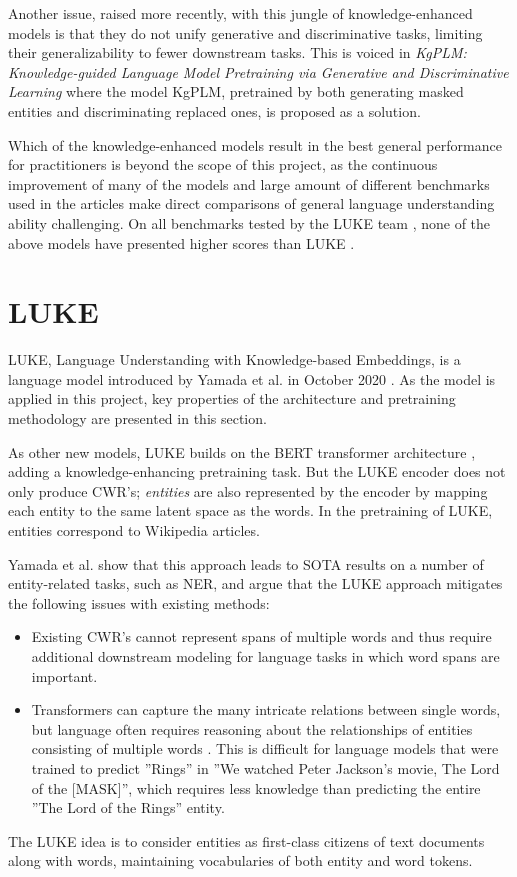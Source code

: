 \documentclass[main.tex]{subfiles}
\begin{document}
Another issue, raised more recently, with this jungle of knowledge-enhanced models is that they do not unify generative and discriminative tasks, limiting their generalizability to fewer downstream tasks.
This is voiced in \emph{KgPLM: Knowledge-guided Language Model Pretraining via Generative and Discriminative Learning} \cite{he2020kgplm} where the model KgPLM, pretrained by both generating masked entities and discriminating replaced ones, is proposed as a solution.

Which of the knowledge-enhanced models result in the best general performance for practitioners is beyond the scope of this project, as the continuous improvement of many of the models and large amount of different benchmarks used in the articles make direct comparisons of general language understanding ability challenging.
On all benchmarks tested by the LUKE team \cite{yamada2020luke}, none of the above models have presented higher scores than LUKE \cite[Sec. 4]{yamada2020luke}.


\section{LUKE}
\label{sec:LUKE}
LUKE, Language Understanding with Knowledge-based Embeddings, is a language model introduced by Yamada et al. in October 2020 \cite{yamada2020luke}.
As the model is applied in this project, key properties of the architecture and pretraining methodology are presented in this section.

As other new models, LUKE builds on the BERT transformer architecture \cite{devlin2019bert}, adding a knowledge-enhancing pretraining task.
But the LUKE encoder does not only produce CWR's; 
\emph{entities} are also represented by the encoder by mapping each entity to the same latent space as the words.
In the pretraining of LUKE, entities correspond to Wikipedia articles.

Yamada et al. show that this approach leads to SOTA results on a number of entity-related tasks, such as NER, and argue that the LUKE approach mitigates the following issues with existing methods:
\begin{itemize}
    \item
        Existing CWR's cannot represent spans of multiple words and thus require additional downstream modeling for language tasks in which word spans are important.
    \item
        Transformers can capture the many intricate relations between single words, but language often requires reasoning about the relationships of entities consisting of multiple words \cite{yamada2020luke}.
        This is difficult for language models that were trained to predict ''Rings'' in ''We watched Peter Jackson's movie, The Lord of the [MASK]'', which requires less knowledge than predicting the entire ''The Lord of the Rings'' entity.
\end{itemize}
The LUKE idea is to consider entities as first-class citizens of text documents along with words, maintaining vocabularies of both entity and word tokens.
\end{document}
